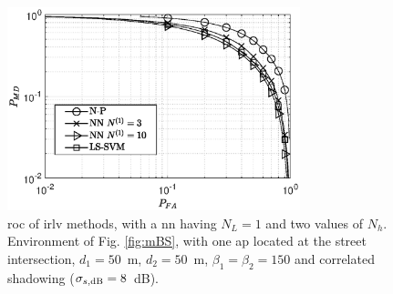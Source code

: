 \documentclass[final,twocolumn]{IEEEtran}
\begin{document}
\begin{figure}[t]
    \centering
    \includegraphics[width=8.5cm]{res_NP_approx_SVM.eps}
    \caption{\ac{roc} of \ac{irlv} methods, with a \ac{nn} having $N_L=1$ and two values of $N_h$. Environment of Fig. \ref{fig:mBS}, with one \ac{ap} located at the street intersection, $d_1 = 50$~m, $d_2 = 50$~m, $\beta_1 = \beta_2 = 150$ and correlated shadowing ($\sigma_{s, {\rm dB}} = 8$~dB).}
    \label{fig:trueMap}
\end{figure}
\end{document}
